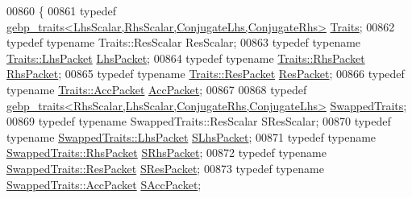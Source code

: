 \begin{DoxyCode}
00860 \{
00861   \textcolor{keyword}{typedef} \hyperlink{class_eigen_1_1internal_1_1gebp__traits}{gebp\_traits<LhsScalar,RhsScalar,ConjugateLhs,ConjugateRhs>}
       \hyperlink{class_eigen_1_1internal_1_1gebp__traits}{Traits};
00862   \textcolor{keyword}{typedef} \textcolor{keyword}{typename} Traits::ResScalar ResScalar;
00863   \textcolor{keyword}{typedef} \textcolor{keyword}{typename} \hyperlink{class_eigen_1_1internal_1_1_tensor_lazy_evaluator_writable}{Traits::LhsPacket} \hyperlink{class_eigen_1_1internal_1_1_tensor_lazy_evaluator_writable}{LhsPacket};
00864   \textcolor{keyword}{typedef} \textcolor{keyword}{typename} \hyperlink{class_eigen_1_1internal_1_1_tensor_lazy_evaluator_writable}{Traits::RhsPacket} \hyperlink{class_eigen_1_1internal_1_1_tensor_lazy_evaluator_writable}{RhsPacket};
00865   \textcolor{keyword}{typedef} \textcolor{keyword}{typename} \hyperlink{class_eigen_1_1internal_1_1_tensor_lazy_evaluator_writable}{Traits::ResPacket} \hyperlink{class_eigen_1_1internal_1_1_tensor_lazy_evaluator_writable}{ResPacket};
00866   \textcolor{keyword}{typedef} \textcolor{keyword}{typename} \hyperlink{class_eigen_1_1internal_1_1_tensor_lazy_evaluator_writable}{Traits::AccPacket} \hyperlink{class_eigen_1_1internal_1_1_tensor_lazy_evaluator_writable}{AccPacket};
00867 
00868   \textcolor{keyword}{typedef} \hyperlink{class_eigen_1_1internal_1_1gebp__traits}{gebp\_traits<RhsScalar,LhsScalar,ConjugateRhs,ConjugateLhs>}
       \hyperlink{class_eigen_1_1internal_1_1gebp__traits}{SwappedTraits};
00869   \textcolor{keyword}{typedef} \textcolor{keyword}{typename} SwappedTraits::ResScalar SResScalar;
00870   \textcolor{keyword}{typedef} \textcolor{keyword}{typename} \hyperlink{class_eigen_1_1internal_1_1_tensor_lazy_evaluator_writable}{SwappedTraits::LhsPacket} \hyperlink{class_eigen_1_1internal_1_1_tensor_lazy_evaluator_writable}{SLhsPacket};
00871   \textcolor{keyword}{typedef} \textcolor{keyword}{typename} \hyperlink{class_eigen_1_1internal_1_1_tensor_lazy_evaluator_writable}{SwappedTraits::RhsPacket} \hyperlink{class_eigen_1_1internal_1_1_tensor_lazy_evaluator_writable}{SRhsPacket};
00872   \textcolor{keyword}{typedef} \textcolor{keyword}{typename} \hyperlink{class_eigen_1_1internal_1_1_tensor_lazy_evaluator_writable}{SwappedTraits::ResPacket} \hyperlink{class_eigen_1_1internal_1_1_tensor_lazy_evaluator_writable}{SResPacket};
00873   \textcolor{keyword}{typedef} \textcolor{keyword}{typename} \hyperlink{class_eigen_1_1internal_1_1_tensor_lazy_evaluator_writable}{SwappedTraits::AccPacket} \hyperlink{class_eigen_1_1internal_1_1_tensor_lazy_evaluator_writable}{SAccPacket};

\end{DoxyCode}
